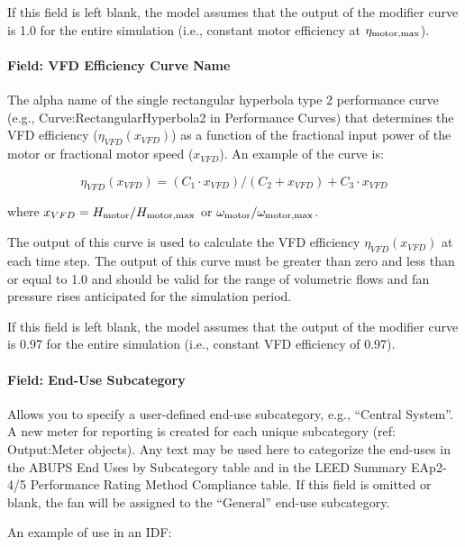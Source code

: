 If this field is left blank, the model assumes that the output of the modifier curve is 1.0 for the entire simulation (i.e., constant motor efficiency at \(\eta_{\rm{motor, max}}\)).

\paragraph{Field: VFD Efficiency Curve Name}\label{field-vfd-efficiency-curve-name}

The alpha name of the single rectangular hyperbola type 2 performance curve (e.g., Curve:RectangularHyperbola2 in Performance Curves) that determines the VFD efficiency (\(\eta_{VFD}(x_{VFD})\)) as a function of the fractional input power of the motor or fractional motor speed (\(x_{VFD}\)). An example of the curve is:

\begin{equation}
  \eta_{VFD}(x_{VFD}) = (C_1 \cdot x_{VFD}) / (C_2 + x_{VFD}) + C_3 \cdot x_{VFD}
\end{equation}

where \(x_{VFD} = H_{\rm{motor}} / H_{\rm{motor, max}}\) or \(\omega_{\rm{motor}} / \omega_{\rm{motor, max}}\).

The output of this curve is used to calculate the VFD efficiency \(\eta_{VFD}(x_{VFD})\) at each time step. The output of this curve must be greater than zero and less than or equal to 1.0 and should be valid for the range of volumetric flows and fan pressure rises anticipated for the simulation period.

If this field is left blank, the model assumes that the output of the modifier curve is 0.97 for the entire simulation (i.e., constant VFD efficiency of 0.97).

\paragraph{Field: End-Use Subcategory}\label{field-end-use-subcategory-4}

Allows you to specify a user-defined end-use subcategory, e.g., ``Central System''. A new meter for reporting is created for each unique subcategory (ref: Output:Meter objects). Any text may be used here to categorize the end-uses in the ABUPS End Uses by Subcategory table and in the LEED Summary EAp2-4/5 Performance Rating Method Compliance table. If this field is omitted or blank, the fan will be assigned to the ``General'' end-use subcategory.

An example of use in an IDF:

